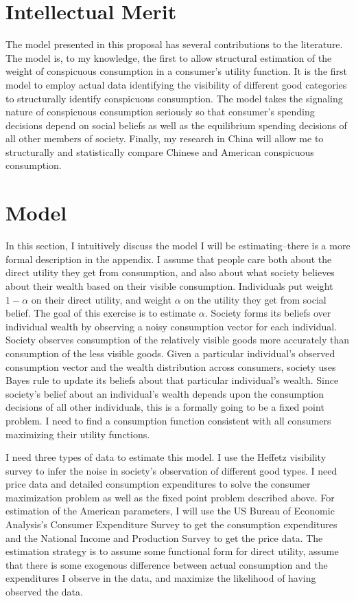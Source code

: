 \documentclass[a4paper,10pt]{article}
\begin{document}
\section{Intellectual Merit}
The model presented in this proposal has several contributions to the literature.  The model is, to my knowledge, the first to allow structural estimation of the weight of conspicuous consumption in a consumer's utility function.  It is the first model to employ actual data identifying the visibility of different good categories to structurally identify conspicuous consumption.  The model takes the signaling nature of conspicuous consumption seriously so that consumer's spending decisions depend on social beliefs as well as the equilibrium spending decisions of all other members of society.  Finally, my research in China will allow me to structurally and statistically compare Chinese and American conspicuous consumption.        

\section{Model}
In this section, I intuitively discuss the model I will be estimating--there is a more formal description in the appendix.  I assume that people care both about the direct utility they get from consumption, and also about what society believes about their wealth based on their visible consumption.  Individuals put weight $1-\alpha$ on their direct utility, and weight $\alpha$ on the utility they get from social belief.  The goal of this exercise is to estimate $\alpha$.  Society forms its beliefs over individual wealth by observing a noisy consumption vector for each individual.  Society observes consumption of the relatively visible goods more accurately than consumption of the less visible goods.  Given a particular individual's observed consumption vector and the wealth distribution across consumers, society uses Bayes rule to update its beliefs about that particular individual's wealth.  Since society's belief about an individual's wealth depends upon the consumption decisions of all other individuals, this is a formally going to be a fixed point problem.  I need to find a consumption function consistent with all consumers maximizing their utility functions. 

I need three types of data to estimate this model.  I use the Heffetz visibility survey to infer the noise in society's observation of different good types.  I need price data and detailed consumption expenditures to solve the consumer maximization problem as well as the fixed point problem described above.  For estimation of the American parameters, I will use the US Bureau of Economic Analysis's Consumer Expenditure Survey to get the consumption expenditures and the National Income and Production Survey to get the price data.  The estimation strategy is to assume some functional form for direct utility, assume that there is some exogenous difference between actual consumption and the expenditures I observe in the data, and maximize the likelihood of having observed the data.
\end{document}
